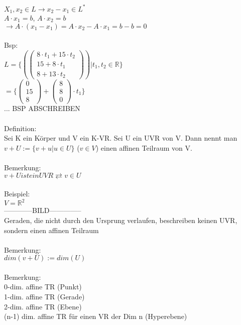 \documentclass{scrartcl}
\begin{document}
$X_1, x_2 \in L \rightarrow x_2 - x_1 \in L^*$\\
$A \cdot x_1 = b$,
$A \cdot x_2 = b$\\
$\rightarrow A\cdot (x_1 - x_1) = A \cdot x_2 - A \cdot x_1 = b-b =0$\\\\
Bsp:\\
$L = \{ (\begin{pmatrix}
	8 \cdot t_1 + 15 \cdot t_2 \\ 15 + 8 \cdot t_1 \\ 8 + 13 \cdot t_2
\end{pmatrix}) \vert t_1,t_2 \in \mathbb{R} \}$ \\
$=\{ \begin{pmatrix}
	0 \\ 15 \\ 8
\end{pmatrix} + \begin{pmatrix}
	8 \\ 8 \\ 0
\end{pmatrix} \cdot t_1 \}$\\
... BSP ABSCHREIBEN
\\\\
Definition:\\
Sei K ein Körper und V ein K-VR. Sei U ein UVR von V. Dann nennt man $v+U := \{ v + u \vert u \in U\}$ ($v \in V$) einen affinen Teilraum von V.\\\\
Bemerkung: \\
$v+U ist ein UVR \rightleftarrows v\in U$\\
\\
Beispiel:\\
$V = \mathbb{R}^2$\\
------------BILD--------------\\
Geraden, die nicht durch den Ursprung verlaufen, beschreiben keinen UVR, sondern einen affinen Teilraum\\
\\
Bemerkung:\\
$dim(v + U) := dim(U)$\\
\\
Bemerkung:\\
0-dim. affine TR \hspace{1cm} (Punkt)\\ 1-dim. affine TR \hspace{1cm}(Gerade)\\ 2-dim. affine TR \hspace{1 cm}(Ebene)\\ (n-1) dim. affine TR für einen VR der Dim n \hspace{1cm}(Hyperebene)\\\\
\end{document}
